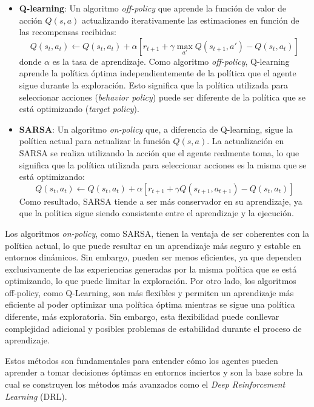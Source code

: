 \documentclass[a4paper,12pt, twoside]{report}
\begin{document}
\begin{itemize}
    \item \textbf{Q-learning}: Un algoritmo \textit{off-policy} que aprende la función de valor de 
    acción \(Q(s, a)\) actualizando iterativamente las estimaciones en función de las recompensas recibidas:
    \[
    Q(s_t, a_t) \leftarrow Q(s_t, a_t) + \alpha \left[r_{t+1} + \gamma \max_{a'} Q(s_{t+1}, a') - Q(s_t, a_t)\right]
    \]
    donde \(\alpha\) es la tasa de aprendizaje. Como algoritmo \textit{off-policy}, Q-learning aprende la 
    política óptima independientemente de la política que el agente sigue durante la exploración. 
    Esto significa que la política utilizada para seleccionar acciones (\textit{behavior policy}) 
    puede ser diferente de la política que se está optimizando (\textit{target policy}).

    \item \textbf{SARSA}: Un algoritmo \textit{on-policy} que, a diferencia de Q-learning, sigue la 
    política actual para actualizar la función \(Q(s, a)\). La actualización en SARSA se realiza 
    utilizando la acción que el agente realmente toma, lo que significa que la política utilizada 
    para seleccionar acciones es la misma que se está optimizando:
    \[
    Q(s_t, a_t) \leftarrow Q(s_t, a_t) + \alpha \left[r_{t+1} + \gamma Q(s_{t+1}, a_{t+1}) - Q(s_t, a_t)\right]
    \]
    Como resultado, SARSA tiende a ser más conservador en su aprendizaje, ya que la política sigue 
    siendo consistente entre el aprendizaje y la ejecución.

\end{itemize}


Los algoritmos \textit{on-policy}, como SARSA, tienen la ventaja de ser coherentes con la política 
actual, lo que puede resultar en un aprendizaje más seguro y estable en entornos dinámicos. Sin embargo, 
pueden ser menos eficientes, ya que dependen exclusivamente de las experiencias generadas por la misma 
política que se está optimizando, lo que puede limitar la exploración. Por otro lado, los algoritmos 
off-policy, como Q-Learning, son más flexibles y permiten un aprendizaje más eficiente al poder optimizar 
una política óptima mientras se sigue una política diferente, más exploratoria. Sin embargo, esta 
flexibilidad puede conllevar complejidad adicional y posibles problemas de estabilidad durante el 
proceso de aprendizaje.

Estos métodos son fundamentales para entender cómo los agentes pueden aprender a tomar decisiones 
óptimas en entornos inciertos y son la base sobre la cual se construyen los métodos más avanzados 
como el \textit{Deep Reinforcement Learning} (DRL).
\end{document}
